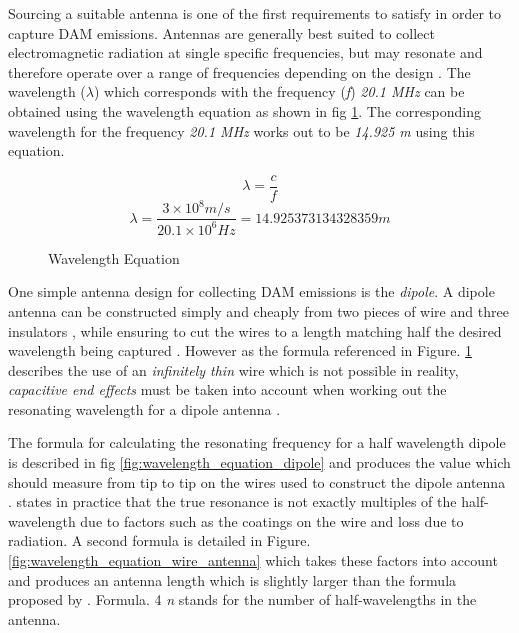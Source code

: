 \documentclass[runningheads,a4paper]{llncs}
\begin{document}
Sourcing a suitable antenna is one of the first requirements to satisfy in order to capture \gls{DAM} emissions. Antennas are generally best suited to collect electromagnetic radiation at single specific frequencies, but may resonate and therefore operate over a range of frequencies depending on the design \citep{nasa12}. The wavelength ($\lambda$) which corresponds with the frequency (\textit{f}) \textit{20.1 MHz} can be obtained using the wavelength equation as shown in fig \ref{fig:wavelength_equation}. The corresponding wavelength for the frequency \textit{20.1 MHz} works out to be \textit{14.925 m} using this equation.

%
\begin{figure}[here]
  \centering
  \begin{equation}  	
    \lambda = \frac{c}{f}
  \end{equation}
  \begin{equation}
    \lambda = \frac{3\times10^8 m/s}{20.1\times10^6 Hz} = 14.925373134328359 m
  \end{equation}
  \caption{Wavelength Equation}
  \label{fig:wavelength_equation}
\end{figure}
%

One simple antenna design for collecting \gls{DAM} emissions is the \textit{dipole}. A dipole antenna can be constructed simply and cheaply from two pieces of wire and three insulators \citep{nasa12}, while ensuring to cut the wires to a length matching half the desired wavelength being captured \citep{nasa12}. However as the formula referenced in Figure. \ref{fig:wavelength_equation} describes the use of an \textit{infinitely thin} wire which is not possible in reality, \textit{capacitive end effects} must be taken into account when working out the resonating wavelength for a dipole antenna \citep{nasa12}.

The formula for calculating the resonating frequency for a half wavelength dipole is described in fig \ref{fig:wavelength_equation_dipole} and produces the value which should measure from tip to tip on the wires used to construct the dipole antenna \citep{nasa12}. \cite{RSGB-14} states in practice that the true resonance is not exactly multiples of the half-wavelength due to factors such as the coatings on the wire and loss due to radiation. A second formula is detailed in Figure. \ref{fig:wavelength_equation_wire_antenna} which takes these factors into account and produces an antenna length which is slightly larger than the formula proposed by \citep{nasa12}. Formula. 4 \textit{n} stands for the number of half-wavelengths in the antenna.
\end{document}
